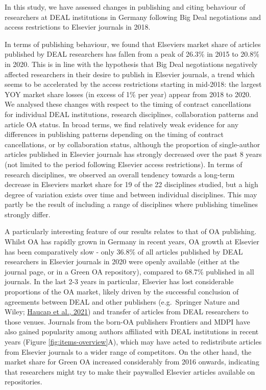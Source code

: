 \documentclass[
]{article}
\begin{document}
In this study, we have assessed changes in publishing and citing behaviour of researchers at DEAL institutions in Germany following Big Deal negotiations and access restrictions to Elsevier journals in 2018.

In terms of publishing behaviour, we found that Elsevier\textquotesingle s market share of articles published by DEAL researchers has fallen from a peak of 26.3\% in 2015 to 20.8\% in 2020. This is in line with the hypothesis that Big Deal negotiations negatively affected researchers in their desire to publish in Elsevier journals, a trend which seems to be accelerated by the access restrictions starting in mid-2018: the largest YOY market share losses (in excess of 1\% per year) appear from 2018 to 2020. We analysed these changes with respect to the timing of contract cancellations for individual DEAL institutions, research disciplines, collaboration patterns and article OA status. In broad terms, we find relatively weak evidence for any differences in publishing patterns depending on the timing of contract cancellations, or by collaboration status, although the proportion of single-author articles published in Elsevier journals has strongly decreased over the past 8 years (not limited to the period following Elsevier access restrictions). In terms of research disciplines, we observed an overall tendency towards a long-term decrease in Elsevier\textquotesingle s market share for 19 of the 22 disciplines studied, but a high degree of variation exists over time and between individual disciplines. This may partly be the result of including a range of disciplines where publishing timelines strongly differ.

A particularly interesting feature of our results relates to that of OA publishing. Whilst OA has rapidly grown in Germany in recent years, OA growth at Elsevier has been comparatively slow - only 36.8\% of all articles published by DEAL researchers in Elsevier journals in 2020 were openly available (either at the journal page, or in a Green OA repository), compared to 68.7\% published in all journals. In the last 2-3 years in particular, Elsevier has lost considerable proportions of the OA market, likely driven by the successful conclusion of agreements between DEAL and other publishers (e.g.~Springer Nature and Wiley; \href{https://www.cesifo.org/en/publikationen/2021/working-paper/impact-german-deal-competition-academic-publishing-market}{Haucap et al., 2021}) and transfer of articles from DEAL researchers to those venues. Journals from the born-OA publishers Frontiers and MDPI have also gained popularity among authors affiliated with DEAL institutions in recent years (Figure \ref{fig:items-overview}A), which may have acted to redistribute articles from Elsevier journals to a wider range of competitors. On the other hand, the market share for Green OA increased considerably from 2016 onwards, indicating that researchers might try to make their paywalled Elsevier articles available on repositories.
\end{document}
